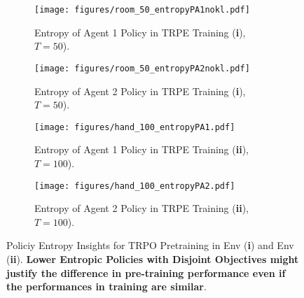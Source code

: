 \begin{figure*}[!]
    \centering
    
    \vfill
    \begin{subfigure}[b]{0.245\textwidth}
        \texttt{[image: figures/room\_50\_entropyPA1nokl.pdf]}
        \caption{\centering Entropy of Agent 1 Policy in TRPE Training (\textbf{i}), $T=50$).}
        \label{subfig:image93}
    \end{subfigure}
    \hfill
    \begin{subfigure}[b]{0.245\textwidth}
        \texttt{[image: figures/room\_50\_entropyPA2nokl.pdf]}
        \caption{\centering Entropy of Agent 2 Policy in TRPE Training (\textbf{i}), $T=50$).}
        \label{subfig:image130}
    \end{subfigure}
    \hfill
    \begin{subfigure}[b]{0.245\textwidth}
        \texttt{[image: figures/hand\_100\_entropyPA1.pdf]}
        \caption{\centering Entropy of Agent 1 Policy in TRPE Training (\textbf{ii}), $T=100$).}
        \label{subfig:image130}
    \end{subfigure}
    \hfill
    \begin{subfigure}[b]{0.245\textwidth}
        \texttt{[image: figures/hand\_100\_entropyPA2.pdf]}
        \caption{\centering Entropy of Agent 2 Policy in TRPE Training (\textbf{ii}), $T=100$).}
        \label{subfig:image130}
    \end{subfigure}
\caption{\centering Policiy Entropy Insights for TRPO Pretraining in Env (\textbf{i}) and Env (\textbf{ii}). \textbf{Lower Entropic Policies with Disjoint Objectives might justify the difference in pre-training performance even if the performances in training are similar}.}
\label{fig:333}
\end{figure*}

